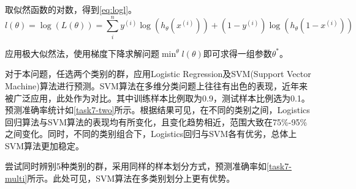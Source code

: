 \documentclass[a4paper,12pt]{article}
\begin{document}
    取似然函数的对数，得到\cref{eq:logl}。
    \begin{equation}
      \label{eq:logl}
      l(\theta) = \log(L(\theta)) = \sum_{i}^n {y^{(i)} \log(h_\theta(x^{(i)})) + (1 - y^{(i)}) \log(h_\theta(1-x^{(i)}))}
    \end{equation}

    应用极大似然法，使用梯度下降求解问题$\min^{\theta} l(\theta)$即可求得一组参数$\theta^*$。

    对于本问题，任选两个类别的群，应用Logistic Regression及SVM(Support Vector Machine)算法进行预测。SVM算法在多维分类问题上往往有出色的表现，近年来被广泛应用，此处作为对比。其中训练样本比例取为0.9，测试样本比例选为0.1。预测准确率统计如\cref{task7-two}所示。根据结果可见，在不同的类别之间，Logistics回归算法与SVM算法的表现均有所变化，且变化趋势相近，范围大致在75\%-95\%之间变化。同时，不同的类别组合下，Logistics回归与SVM各有优劣，总体上SVM算法更加稳定。
    

    尝试同时辨别5种类别的群，采用同样的样本划分方式，预测准确率如\cref{task7-multi}所示。此处可见，SVM算法在多类别划分上更有优势。
    
    \label{applastpage}
    \newpage
    
    
\iffalse
\begin{itemize}[noitemsep,topsep=0pt]
\end{itemize}
\begin{enumerate}[label=\Roman{*}.,noitemsep,topsep=0pt]
\end{enumerate}
\begin{multicols}{2}
\end{multicols}
\fi
\end{document}
